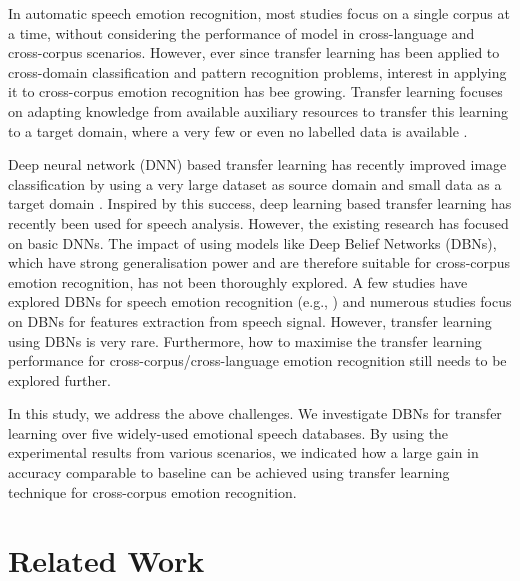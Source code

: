 \documentclass[a4paper]{article}
\begin{document}
In automatic speech emotion recognition, most studies focus on a single corpus at a time, without considering the performance of model in cross-language and cross-corpus scenarios.
However, ever since transfer learning has been applied to cross-domain classification and pattern recognition problems, interest in applying it to cross-corpus emotion recognition has bee growing. Transfer learning focuses on adapting knowledge from available auxiliary resources to transfer this learning to a target domain, where a very few or even no labelled data is available \cite{pan2010survey,lu2015transfer}. 

Deep neural network (DNN) based transfer learning has recently improved image classification by using a very large dataset as source domain and small data as a target domain \cite{sawada2015transfer}. 
Inspired by this success, deep learning based transfer learning has recently been used for speech analysis. However, the existing research has focused on basic DNNs. The impact of using models like Deep Belief Networks (DBNs), which have strong generalisation power and are therefore suitable for cross-corpus emotion recognition, has not been thoroughly explored. A few studies have explored DBNs for speech emotion recognition (e.g., \cite{le2013emotion,rana2016emotion}) and numerous studies focus on DBNs for features extraction \cite{xia2017multi,schmidt2011learning,huang2014research} from speech signal. However, transfer learning using DBNs is very rare. Furthermore, how to maximise the transfer learning performance for cross-corpus/cross-language emotion recognition still needs to be explored further.


 

In this study, we address the above challenges. We investigate DBNs for transfer learning over five widely-used emotional speech databases. By using the experimental results from various scenarios, we indicated how a large gain in accuracy comparable to baseline can be achieved using transfer learning technique for cross-corpus emotion recognition.






\section{Related Work}
\label{sec:back}
\end{document}
